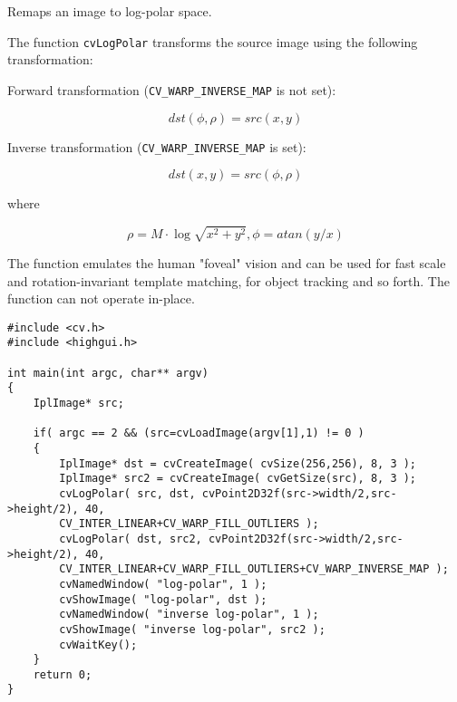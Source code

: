 Remaps an image to log-polar space.


\begin{description}
\end{description}

The function \texttt{cvLogPolar} transforms the source image using the following transformation:

Forward transformation (\texttt{CV\_WARP\_INVERSE\_MAP} is not set):

\[
dst(\phi,\rho) = src(x,y)
\]

Inverse transformation (\texttt{CV\_WARP\_INVERSE\_MAP} is set):

\[
dst(x,y) = src(\phi,\rho)
\]

where

\[
\rho = M \cdot \log{\sqrt{x^2 + y^2}},
\phi=atan(y/x)
\]

The function emulates the human "foveal" vision and can be used for fast scale and rotation-invariant template matching, for object tracking and so forth.
The function can not operate in-place.

\ifC
\begin{lstlisting}
#include <cv.h>
#include <highgui.h>

int main(int argc, char** argv)
{
    IplImage* src;

    if( argc == 2 && (src=cvLoadImage(argv[1],1) != 0 )
    {
        IplImage* dst = cvCreateImage( cvSize(256,256), 8, 3 );
        IplImage* src2 = cvCreateImage( cvGetSize(src), 8, 3 );
        cvLogPolar( src, dst, cvPoint2D32f(src->width/2,src->height/2), 40, 
        CV_INTER_LINEAR+CV_WARP_FILL_OUTLIERS );
        cvLogPolar( dst, src2, cvPoint2D32f(src->width/2,src->height/2), 40, 
        CV_INTER_LINEAR+CV_WARP_FILL_OUTLIERS+CV_WARP_INVERSE_MAP );
        cvNamedWindow( "log-polar", 1 );
        cvShowImage( "log-polar", dst );
        cvNamedWindow( "inverse log-polar", 1 );
        cvShowImage( "inverse log-polar", src2 );
        cvWaitKey();
    }
    return 0;
}
\end{lstlisting}

